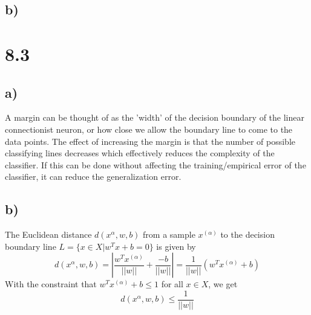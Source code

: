 \documentclass[11pt,a4paper]{article}
\begin{document}
\subsection*{b)}



\section*{8.3}
\subsection*{a)}
A margin can be thought of as the 'width' of the decision boundary of the linear connectionist neuron, or how close we allow the boundary line to come to the data points. The effect of increasing the margin is that the number of possible classifying lines decreases which effectively reduces the complexity of the classifier. If this can be done without affecting the training/empirical error of the classifier, it can reduce the generalization error.
\subsection*{b)}
The Euclidean distance $d(x^\alpha,w,b)$ from a sample $x^{(\alpha)}$ to the decision boundary line $L = \{ x \in X | w^Tx + b = 0\}$ is given by 
\begin{equation}
d(x^\alpha,w,b) = |\frac{w^Tx^{(\alpha)}}{||w||}+\frac{- b}{||w||}| = \frac{1}{||w||}\left ( w^Tx^{(\alpha)} + b \right )
\end{equation}
With the constraint that $w^Tx^{(\alpha)} + b \leq 1$ for all $x \in X$, we get 
\begin{equation}
d(x^\alpha,w,b) \leq \frac{1}{||w||}
\end{equation}
\end{document}
